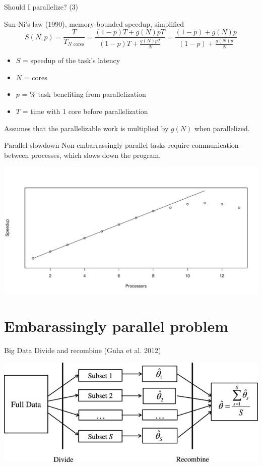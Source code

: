 \documentclass[
  ignorenonframetext,
  usenames,
  dvipsnames]{beamer}
\begin{document}
\begin{frame}{Should I parallelize? (3)}
\protect\hypertarget{should-i-parallelize-3}{}
\begin{block}{Sun-Ni's law (1990), memory-bounded speedup, simplified}
\[
S(N, p) = \frac{T}{T_{N \text{ cores}}} = \frac{(1-p)T + g(N)pT}{(1 - p) T + \frac{g(N)pT}{N}} = \frac{(1-p) + g(N)p}{(1 - p)  + \frac{g(N)p}{N}}
\]
\begin{itemize}
  \itemsep 0em
  \item \(S\) = speedup of the task's latency
  \item \(N\) = cores
  \item \(p\) = \% task benefiting from parallelization
  \item \(T\) = time with 1 core before parallelization
\end{itemize}
\end{block}

Assumes that the parallelizable work is multiplied by \(g(N)\) when
parallelized.
\end{frame}

\begin{frame}{Parallel slowdown}
\protect\hypertarget{parallel-slowdown}{}
Non-embarrassingly parallel tasks require communication between
processes, which slows down the program.

\includegraphics{fast_computing_files/figure-beamer/unnamed-chunk-1-1.pdf}
\end{frame}

\hypertarget{embarassingly-parallel-problem}{%
\section{Embarassingly parallel
problem}\label{embarassingly-parallel-problem}}

\begin{frame}{Big Data}
\protect\hypertarget{big-data}{}
Divide and recombine (Guha et al. 2012)

\includegraphics{Divide-recombine.png}
\end{frame}
\end{document}
